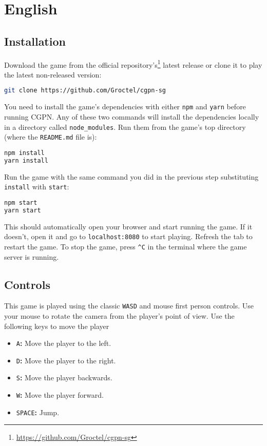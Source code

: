 \chapter*{English}

\section*{Installation}

Download the game from the official repository's\footnote{%
	\url{https://github.com/Groctel/cgpn-sg}
}
latest release or clone it to play the latest non-released version:

\begin{lstlisting}[language=sh]
git clone https://github.com/Groctel/cgpn-sg
\end{lstlisting}

You need to install the game's dependencies with either \texttt{npm} and \texttt{yarn} before running CGPN\@.
Any of these two commands will install the dependencies locally in a directory called \texttt{node\_modules}.
Run them from the game's top directory (where the \texttt{README.md} file is):

\begin{lstlisting}[language=sh]
npm install
yarn install
\end{lstlisting}

Run the game with the same command you did in the previous step substituting \texttt{install} with \texttt{start}:

\begin{lstlisting}[language=sh]
npm start
yarn start
\end{lstlisting}

This should automatically open your browser and start running the game.
If it doesn't, open it and go to \texttt{localhost:8080} to start playing.
Refresh the tab to restart the game.
To stop the game, press \texttt{\^{}C} in the terminal where the game server is running.

\section*{Controls}

This game is played using the classic \texttt{WASD} and mouse first person controls.
Use your mouse to rotate the camera from the player's point of view.
Use the following keys to move the player

\begin{itemize}
	\item
		\texttt{A}\textbf{:}
		Move the player to the left.
	\item
		\texttt{D}\textbf{:}
		Move the player to the right.
	\item
		\texttt{S}\textbf{:}
		Move the player backwards.
	\item
		\texttt{W}\textbf{:}
		Move the player forward.
	\item
		\texttt{SPACE}\textbf{:}
		Jump.
\end{itemize}

